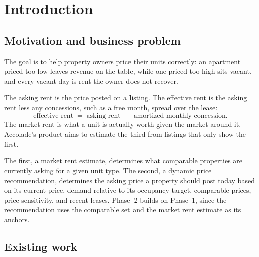\section{Introduction}\label{sec:intro}


\subsection{Motivation and business problem}

 The goal is to help property owners price their units
correctly: an apartment priced too low leaves revenue on the table, while one priced too high sits
vacant, and every vacant day is rent the owner does not recover.


 The asking rent is
the price posted on a listing. The effective rent is the asking rent less any concessions,
such as a free month, spread over the lease:
\[
  \text{effective rent} \;=\; \text{asking rent} \;-\; \text{amortized monthly concession}.
\]
The market rent is what a unit is actually worth given the market around it. Accolade's
product aims to estimate the third from listings that only show the first.

 The first, a
market rent estimate, determines what comparable properties are currently asking for a given
unit type. The second, a dynamic price recommendation, determines the asking price a property
should post today based on its current price, demand relative to its occupancy target, comparable
prices, price sensitivity, and recent leases. Phase~2 builds on Phase~1, since the recommendation
uses the comparable set and the market rent estimate as its anchors.

\subsection{Existing work}

